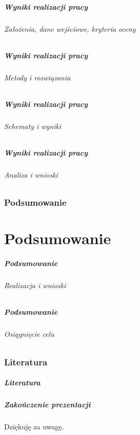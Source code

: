 \documentclass[lualatex,aspectratio=54,12pt,]{beamer}
\begin{document}
\begin{frame}
 \frametitle{Wyniki realizacji pracy}
 \framesubtitle{Założenia, dane wejściowe, kryteria oceny}
\end{frame}

\begin{frame}
 \frametitle{Wyniki realizacji pracy}
 \framesubtitle{Metody i rozwiązania}
\end{frame}

\begin{frame}
 \frametitle{Wyniki realizacji pracy}
 \framesubtitle{Schematy i wyniki}
\end{frame}

\begin{frame}
 \frametitle{Wyniki realizacji pracy}
 \framesubtitle{Analiza i wnioski}
\end{frame}

\section{Podsumowanie}
\part{Podsumowanie}

\begin{frame}
      \partpage
\end{frame}

\begin{frame}
 \frametitle{Podsumowanie}
 \framesubtitle{Realizacja i wnioski}
\end{frame}

\begin{frame}
 \frametitle{Podsumowanie}
 \framesubtitle{Osiągnięcie celu}
\end{frame}

\section{Literatura}

\begin{frame}
 \frametitle{Literatura}
\end{frame}


\begin{frame}
      \frametitle{Zakończenie prezentacji}
      \centering %
      \Huge %
      \textcolor{Logo}{Dziękuję za uwagę.} %
\end{frame}
\end{document}
